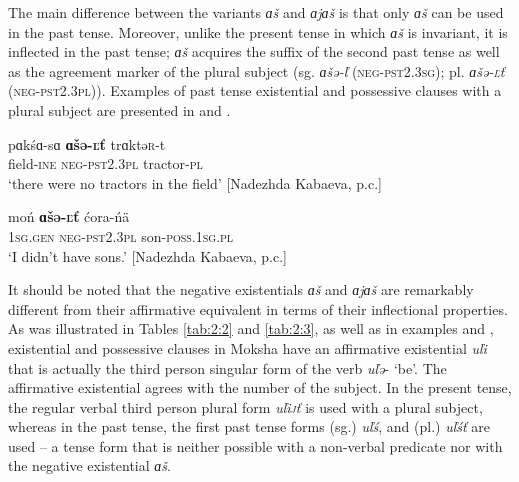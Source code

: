 \documentclass[output=paper]{langsci/langscibook}
\begin{document}
  The main difference between the variants \textit{ɑš} and \textit{ɑjɑš} is that only \textit{ɑš} can be used in the past tense. Moreover, unlike the present tense in which \textit{ɑš} is invariant, it is inflected in the past tense; \textit{ɑš} acquires the suffix of the second past tense as well as the agreement marker of the plural subject (sg. \textit{ɑšə-ľ} (\textsc{neg-pst2.3sg}); pl. \textit{ɑšə-\textsc{ľ}ť} (\textsc{neg-pst2.3pl)}). Examples of past tense existential and possessive clauses with a plural subject are presented in  and .

\ea\label{ex:moksha-tractor}
\gll pɑkśɑ-sɑ \textbf{ɑšə-\textsc{ľ}ť} trɑktə\textsc{r}-t\\
field-\textsc{ine}    \textsc{neg-pst2.3pl}    tractor-\textsc{pl}\\
\glt `there were no tractors in the field' [Nadezhda Kabaeva, p.c.]
\z

\ea\label{ex:moksha-no-sons-pst}
\gll moń \textbf{ɑšə-\textsc{ľ}ť} ćora-ńä\\
\textsc{1sg.gen}    \textsc{neg-pst2.3pl}    son-\textsc{poss.1sg.pl}\\
\glt `I didn't have sons.' [Nadezhda Kabaeva, p.c.]
\z

  It should be noted that the negative existentials \textit{ɑš} and \textit{ɑjɑš} are remarkably different from their affirmative equivalent in terms of their inflectional properties. As was illustrated in Tables \ref{tab:2:2} and \ref{tab:2:3}, as well as in examples  and , existential and possessive clauses in Moksha have an affirmative existential \textit{uľi} that is actually the third person singular form of the verb \textit{uľə}- `be'. The affirmative existential agrees with the number of the subject. In the present tense, the regular verbal third person plural form \textit{uľi\textsc{j}ť} is used with a plural subject, whereas in the past tense, the first past tense forms (sg.) \textit{uľś}, and (pl.) \textit{uľśť} are used -- a tense form that is neither possible with a non-verbal predicate nor with the negative existential \textit{ɑš}.
\end{document}
